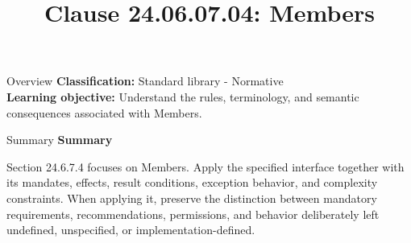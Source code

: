 \documentclass[10pt,letterpaper]{article}
\title{Clause 24.06.07.04: Members}
\author{}
\date{}
\begin{document}
\maketitle
\begin{CornellOverviewBox}{Overview}
\textbf{Classification:} Standard library - Normative\\[2pt]
\textbf{Learning objective:} Understand the rules, terminology, and semantic consequences associated with Members.
\end{CornellOverviewBox}\begin{CornellSummaryBox}{Summary}
{\sffamily\bfseries\color{Accent} Summary}\par\vspace{3pt}Section 24.6.7.4 focuses on Members. Apply the specified interface together with its mandates, effects, result conditions, exception behavior, and complexity constraints. When applying it, preserve the distinction between mandatory requirements, recommendations, permissions, and behavior deliberately left undefined, unspecified, or implementation-defined.
\end{CornellSummaryBox}
\end{document}
